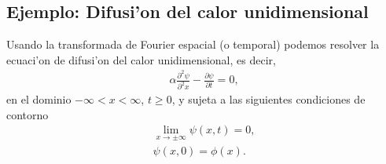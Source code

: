 \subsection{Ejemplo: Difusi'on del calor unidimensional}

Usando la transformada de Fourier espacial (o temporal) podemos resolver la ecuaci'on de difusi'on del calor unidimensional, es decir,
\begin{align}\label{ec1dej1}
\alpha \frac{\partial^2 \psi}{\partial^2 x}-\frac{\partial \psi}{\partial t}=0,
\end{align}
en el dominio $-\infty<x<\infty$, $t\ge 0$, y sujeta a las siguientes condiciones de contorno
\begin{align}
\lim_{x \rightarrow \pm \infty}\psi(x,t)=0,\label{eq:bc1}\\
\psi(x,0)=\phi(x).\label{eq:bc2}
\end{align}

